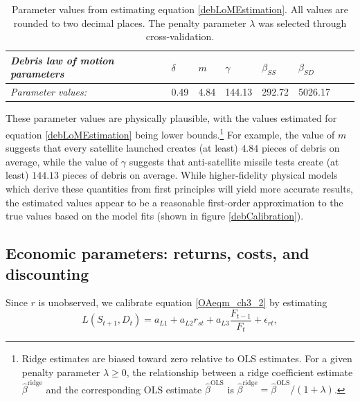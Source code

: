 \documentclass[12pt]{article}
\begin{document}
\begin{table}[H]
	\centering
	\begin{tabular}{|l|l|l|l|l|l|l|l|}
		\hline
		\textit{Debris law of motion parameters} & \textbf{$\delta$} & \textbf{$m$} & \textbf{$\gamma$} & \textbf{$\beta_{SS}$} & \textbf{$\beta_{SD}$} \\ \hline
		\textit{Parameter values:}                           & 0.49                & 4.84         & 144.13              & 292.72                & 5026.17                          \\ \hline
	\end{tabular}
	\caption[Parameter values from estimating equation \ref{debLoMEstimation}]{Parameter values from estimating equation \ref{debLoMEstimation}. All values are rounded to two decimal places. The penalty parameter $\lambda$ was selected through cross-validation.}
	\label{debParms}
\end{table}

These parameter values are physically plausible, with the values estimated for equation \ref{debLoMEstimation} being lower bounds.\footnote{Ridge estimates are biased toward zero relative to OLS estimates. For a given penalty parameter $\lambda \geq 0$, the relationship between a ridge coefficient estimate $\hat{\beta}^{\text{ridge}}$ and the corresponding OLS estimate $\hat{\beta}^{\text{OLS}}$ is $\hat{\beta}^{\text{ridge}} = \hat{\beta}^{\text{OLS}}/(1+\lambda)$.} For example, the value of $m$ suggests that every satellite launched creates (at least) $4.84$ pieces of debris on average, while the value of $\gamma$ suggests that anti-satellite missile tests create (at least) $144.13$ pieces of debris on average. While higher-fidelity physical models which derive these quantities from first principles will yield more accurate results, the estimated values appear to be a reasonable first-order approximation to the true values based on the model fits (shown in figure \ref{debCalibration}).

\subsection{Economic parameters: returns, costs, and discounting}

Since $r$ is unobserved, we calibrate equation \ref{OAeqm_ch3_2} by estimating
\begin{equation}
\label{empiricalEqn}
L(S_{t+1},D_{t}) = a_{L 1} + a_{L 2} r_{st} + a_{L 3} \frac{F_{t-1}}{F_t} + \epsilon_{r t},
\end{equation}
\end{document}
